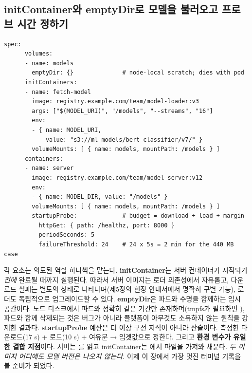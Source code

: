 \subsection*{initContainer와 emptyDir로 모델을 불러오고 프로브 시간 정하기}

\begin{terminalbox}
\begin{Verbatim}[breaklines=true,breakanywhere=true,fontsize=\small,formatcom=\color{tbbtermfg},codes=\tbbcodeactive]
    spec:
      volumes:
      - name: models
        emptyDir: {}              # node-local scratch; dies with pod
      initContainers:
      - name: fetch-model
        image: registry.example.com/team/model-loader:v3
        args: ["$(MODEL_URI)", "/models", "--streams", "16"]
        env:
        - { name: MODEL_URI,
            value: "s3://ml-models/bert-classifier/v7/" }
        volumeMounts: [ { name: models, mountPath: /models } ]
      containers:
      - name: server
        image: registry.example.com/team/model-server:v12
        env:
        - { name: MODEL_DIR, value: "/models" }
        volumeMounts: [ { name: models, mountPath: /models } ]
        startupProbe:             # budget = download + load + margin
          httpGet: { path: /healthz, port: 8000 }
          periodSeconds: 5
          failureThreshold: 24    # 24 x 5s = 2 min for the 440 MB case
\end{Verbatim}
\end{terminalbox}

각 요소는 의도된 역할 하나씩을 맡는다. \textbf{initContainer}는 서버 컨테이너가 시작되기 \textit{전에} 완료될 때까지 실행된다. 따라서 서버 이미지는 로더 의존성에서 자유롭고, 다운로드 실패는 별도의  상태로 나타나며(제5장의 현장 안내서에서 명확히 구별 가능), 로더도 독립적으로 업그레이드할 수 있다. \textbf{emptyDir}은 파드와 수명을 함께하는 임시 공간이다. 노드 디스크에서 파드와 정확히 같은 기간만 존재하며(tmpfs가 필요하면 ), 파드와 함께 삭제되는 것은 버그가 아니라 플랫폼이 아무것도 소유하지 않는 원칙을 강제한 결과다. \textbf{startupProbe} 예산은 더 이상 구전 지식이 아니라 산술이다. 측정한 다운로드(17 s) + 로드(10 s) + 여유분 → 임곗값으로 정한다. 그리고 \textbf{환경 변수가 유일한 결합 지점}이다. 서버는 를 읽고 initContainer는 에서 파일을 가져와 채운다. \textit{두 이미지 어디에도 모델 버전은 나오지 않는다.} 이제 이 장에서 가장 멋진 터미널 기록을 볼 준비가 되었다.

